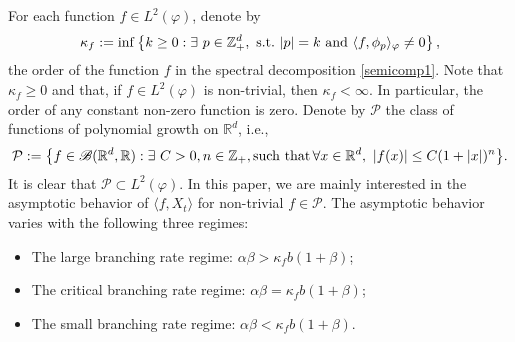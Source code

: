 \documentclass[12pt,a4paper]{amsart}
\theoremstyle{plain}
\theoremstyle{definition}
\numberwithin{equation}{section}
\begin{document}
    For each function $f\in L^2(\varphi)$, denote by
\begin{equation}
    \kappa_f
    :=\inf \left \{k\geq 0: \exists ~ p\in \mathbb Z_+^d ,{\rm ~s.t.~}|p|=k {\rm ~and~}  \langle f, \phi_p \rangle_{\varphi}\neq 0\right \},
\end{equation}
    the order of the function $f$ in the spectral decomposition \eqref{semicomp1}.
    Note that $ \kappa_f\geq 0$ and that, if $f\in L^2(\varphi)$ is non-trivial, then $\kappa_f<\infty$.
    In particular, the order of any constant non-zero function is zero.
    Denote by $\mathcal P$ the class of functions of polynomial growth on $\mathbb R^d$, i.e.,
\begin{equation}
\label{eq: polynomial growth function}
    \mathcal{P}
    :=\big \{f\in \mathscr B(\mathbb R^d, \mathbb R):\exists~ C>0, n \in \mathbb Z_+, {\rm such  \, \, that \, } \forall x\in \mathbb R^d,~ |f(x)|\leq C(1+|x|)^n\big\}.
\end{equation}
    It is clear that $\mathcal{P} \subset L^2(\varphi)$.
    In this paper, we are mainly interested in the asymptotic behavior of $\langle f, X_t\rangle$
    for non-trivial $f\in \mathcal P$.
    The asymptotic behavior varies with the following three regimes:
    \begin{itemize}
\item
    The large branching rate regime: $\alpha\beta>\kappa_fb(1+\beta)$;
\item
    The critical branching rate regime: $\alpha\beta=\kappa_fb(1+\beta)$;
\item
    The small branching rate regime: $\alpha\beta<\kappa_fb(1+\beta)$.
\end{itemize}
\end{document}
